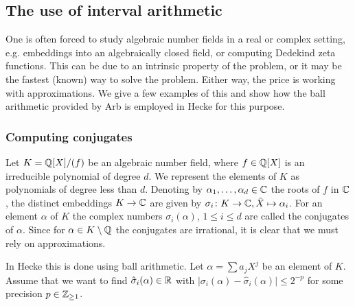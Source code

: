 \documentclass{sig-alternate-05-2015}
\begin{document}

\subsection{The use of interval arithmetic}

One is often forced to study algebraic number fields in a real or complex setting, e.g. embeddings into an algebraically
closed field, or computing Dedekind zeta functions.
This can be due to an intrinsic property of the problem, or it may be the fastest (known)
 way to solve the problem. Either way, the price is working with approximations.
We give a few examples of this and show how the ball arithmetic provided by Arb is employed in Hecke for this purpose.

\subsubsection{Computing conjugates}\label{subsub:conj}

Let $K = \mathbb{Q}[X]/(f)$ be an algebraic number field, where $f \in \mathbb{Q}[X]$ is an irreducible polynomial of degree $d$.
We represent the elements of $K$ as polynomials of degree less than $d$.
Denoting by $\alpha_1,\dotsc,\alpha_d \in \mathbb{C}$ the roots of $f$ in $\mathbb{C}$, the distinct embeddings $K \to \mathbb{C}$ are given by
$\sigma_i \colon K \to \mathbb{C}, \bar X \mapsto \alpha_i$. For an element $\alpha$ of $K$ the complex numbers $\sigma_i(\alpha)$, $1 \leq i \leq d$
are called the conjugates of $\alpha$. Since for $\alpha \in K \setminus \mathbb{Q}$ the conjugates are irrational, it is clear that we must rely on
approximations.

In Hecke this is done using ball arithmetic. Let $\alpha = \sum a_j X^j$ be an element of $K$. 
Assume that we want to find $\hat \sigma_i(\alpha) \in \mathbb{R}$ with $\lvert \sigma_i(\alpha) - \hat \sigma_i(\alpha) \rvert \leq 2^{-p}$
for some precision $p \in \mathbb{Z}_{\geq 1}$.
\end{document}
